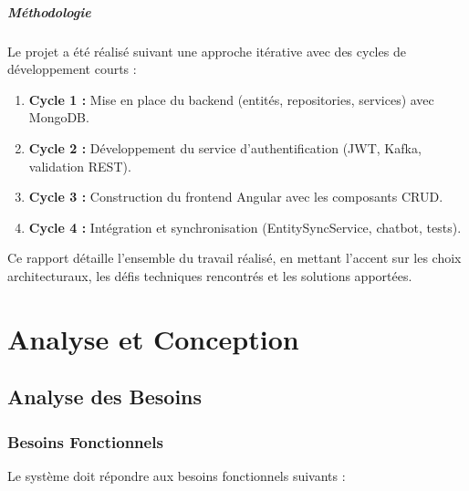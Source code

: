 \documentclass[12pt,a4paper,twoside]{report}
\begin{document}
\paragraph{Méthodologie}
Le projet a été réalisé suivant une approche itérative avec des cycles de développement courts :
\begin{enumerate}[leftmargin=*]
  \item \textbf{Cycle 1 :} Mise en place du backend (entités, repositories, services) avec MongoDB.
  \item \textbf{Cycle 2 :} Développement du service d'authentification (JWT, Kafka, validation REST).
  \item \textbf{Cycle 3 :} Construction du frontend Angular avec les composants CRUD.
  \item \textbf{Cycle 4 :} Intégration et synchronisation (EntitySyncService, chatbot, tests).
\end{enumerate}

\vspace{0.5cm}
Ce rapport détaille l'ensemble du travail réalisé, en mettant l'accent sur les choix architecturaux, les défis techniques rencontrés et les solutions apportées.

\chapter{Analyse et Conception}

\section{Analyse des Besoins}

\subsection{Besoins Fonctionnels}
Le système doit répondre aux besoins fonctionnels suivants :
\end{document}
